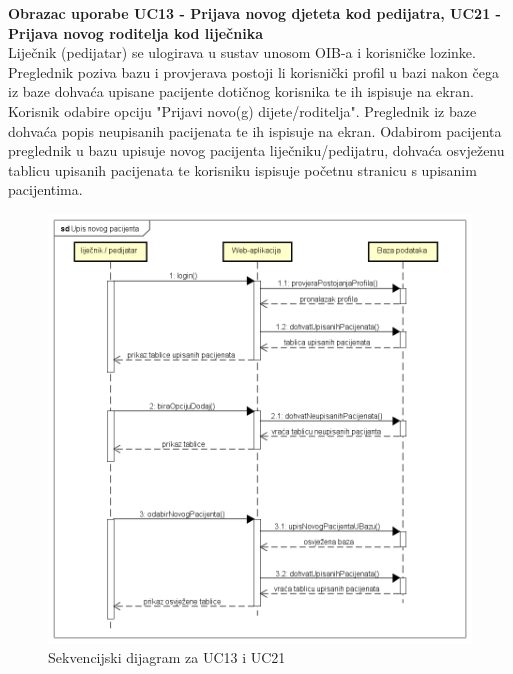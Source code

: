 				\eject
				
				
				
					\textbf{Obrazac uporabe UC13 - Prijava novog djeteta kod pedijatra, UC21 - Prijava novog roditelja kod liječnika}\\
				
				
				Liječnik (pedijatar) se ulogirava u sustav unosom OIB-a i korisničke lozinke. Preglednik poziva bazu i provjerava postoji li korisnički profil u bazi nakon čega iz baze dohvaća upisane pacijente dotičnog korisnika te ih ispisuje na ekran. Korisnik odabire opciju "Prijavi novo(g) dijete/roditelja". Preglednik iz baze dohvaća popis neupisanih pacijenata te ih ispisuje na ekran. Odabirom pacijenta preglednik u bazu upisuje novog pacijenta liječniku/pedijatru, dohvaća osvježenu tablicu upisanih pacijenata te korisniku ispisuje početnu stranicu s upisanim pacijentima.
				
				
				\begin{figure}[H]
					\includegraphics[scale=0.6]{dijagrami/UpisNovogPacijenta.PNG} %
					\centering
					\caption{Sekvencijski dijagram za UC13 i UC21}
					\label{fig:sekvencijski2}
				\end{figure}
				
				\eject
	
